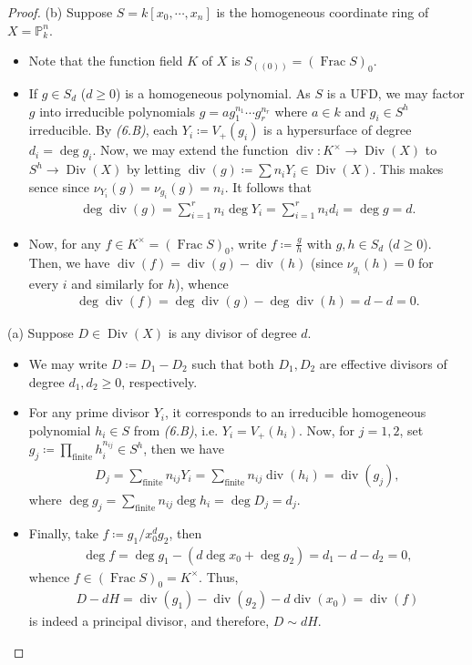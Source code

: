 \documentclass[11pt,a4paper,footinclude=true,headinclude=true]{scrbook} %
\DeclareMathOperator{\Frac}{Frac}
\DeclareMathOperator{\Div}{Div}
\DeclareMathOperator{\dv}{div}
\newcommand{\PP}{\mathbb{P}}
\newcommand{\<}{\langle}
\newcommand{\>}{\rangle}
\begin{document}
\begin{proof}
    (b) Suppose $S=k[x_0,\cdots,x_n]$ is the homogeneous coordinate ring of $X=\PP_k^n$.
    \begin{itemize}
        \item Note that the function field $K$ of $X$ is $S_{((0))}=(\Frac S)_0$.
        \item If $g\in S_d$ ($d\geq0$) is a homogeneous polynomial. As $S$ is a UFD, we may factor $g$ into irreducible polynomials $g=ag_1^{n_1}\cdots g_r^{n_r}$ where $a\in k$ and $g_i\in S^h$ irreducible. By \textit{(6.B)}, each $Y_i\coloneqq V_+(g_i)$ is a hypersurface of degree $d_i=\deg g_i$. Now, we may extend the function $\dv:K^\times\to\Div(X)$ to $S^h\to\Div(X)$ by letting $\dv(g)\coloneqq\sum n_iY_i\in\Div(X)$. This makes sence since $\nu_{Y_i}(g)=\nu_{g_i}(g)=n_i$. It follows that 
        \begin{align*}
            \deg\dv(g)=\sum_{i=1}^rn_i\deg Y_i=\sum_{i=1}^rn_id_i=\deg g=d.
        \end{align*}
        \item Now, for any $f\in K^\times=(\Frac S)_0$, write $f\coloneqq\frac{g}{h}$ with $g,h\in S_d$ ($d\geq0$). Then, we have $\dv(f)=\dv(g)-\dv(h)$ (since $\nu_{g_i}(h)=0$ for every $i$ and similarly for $h$), whence
        \begin{align*}
            \deg\dv(f)=\deg\dv(g)-\deg\dv(h)=d-d=0.
        \end{align*}
    \end{itemize}
    
    (a) Suppose $D\in\Div(X)$ is any divisor of degree $d$. 
    \begin{itemize}
        \item We may write $D\coloneqq D_1-D_2$ such that both $D_1, D_2$ are effective divisors of degree $d_1,d_2\geq0$, respectively. 
        \item For any prime divisor $Y_i$, it corresponds to an irreducible homogeneous polynomial $h_i\in S$ from \textit{(6.B)}, i.e. $Y_i=V_+(h_i)$. Now, for $j=1,2$, set $g_j\coloneqq\prod_{\text{finite}}h_i^{n_{ij}}\in S^h$, then we have
        \begin{align*}
            D_j=\sum_{\text{finite}}n_{ij}Y_i=\sum_{\text{finite}}n_{ij}\dv(h_i)=\dv(g_j),
        \end{align*}
        where $\deg g_j=\sum_{\text{finite}}n_{ij}\deg h_i=\deg D_j=d_j$.
        \item Finally, take $f\coloneqq g_1/x_0^dg_2$, then
        \begin{align*}
            \deg f=\deg g_1-(d\deg x_0+\deg g_2)=d_1-d-d_2=0,
        \end{align*}
        whence $f\in(\Frac S)_0=K^\times$. Thus, 
        \begin{align*}
            D-dH=\dv(g_1)-\dv(g_2)-d\dv(x_0)=\dv(f)
        \end{align*}
        is indeed a principal divisor, and therefore, $D\sim dH$.
    \end{itemize}
    

\end{proof}
\end{document}
